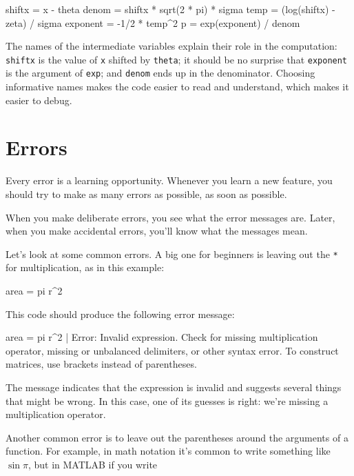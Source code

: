 \begin{code}
shiftx = x - theta
denom = shiftx * sqrt(2 * pi) * sigma
temp = (log(shiftx) - zeta) / sigma
exponent = -1/2 * temp^2
p = exp(exponent) / denom
\end{code}

The names of the intermediate variables explain their role in the
computation:  \lstinline{shiftx} is the value of \lstinline{x} shifted by 
\lstinline{theta};  it should be no surprise that \lstinline{exponent} is the argument of \lstinline{exp}; and \lstinline{denom} ends up in the denominator.  Choosing informative names makes the code easier to read and understand, which makes it easier to debug.



\section{Errors}


Every error is a learning opportunity.
Whenever you learn a new feature, you should try to make as many errors as possible, as soon as possible.

When you make deliberate errors, you see what the error messages are.
Later, when you make accidental errors, you'll know what the messages mean.

Let's look at some common errors. A big one for beginners is leaving out the \lstinline{*}
for multiplication, as in this example:

\begin{code}
area = pi r^2
\end{code}

This code should produce the following error message:

\begin{stdout}
 area = pi r^2
           |
Error: Invalid expression. Check for missing multiplication 
operator, missing or unbalanced delimiters, or other syntax 
error. To construct matrices, use brackets instead of parentheses.
\end{stdout}
%
%

The message indicates that the expression is invalid and suggests several things that might be wrong.
In this case, one of its guesses is right: we're missing a multiplication operator.


Another common error is to leave out the parentheses around the
arguments of a function.  For example, in math notation it's common
to write something like $\sin \pi$, but in MATLAB if you write

